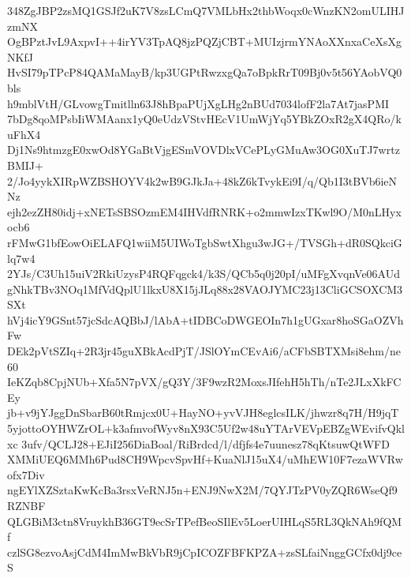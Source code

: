 348ZgJBP2zsMQ1GSJf2uK7V8zsLCmQ7VMLbHx2thbWoqx0cWnzKN2omULIHJzmNX
OgBPztJvL9AxpvI++4irYV3TpAQ8jzPQZjCBT+MUIzjrmYNAoXXnxaCeXsXgNKfJ
HvSI79pTPcP84QAMaMayB/kp3UGPtRwzxgQa7oBpkRrT09Bj0v5t56YAobVQ0bls
h9mblVtH/GLvowgTmitlln63J8hBpaPUjXgLHg2nBUd7034lofF2la7At7jasPMI
7bDg8qoMPsbIiWMAanx1yQ0eUdzVStvHEcV1UmWjYq5YBkZOxR2gX4QRo/kuFhX4
Dj1Ns9htmzgE0xwOd8YGaBtVjgESmVOVDlxVCePLyGMuAw3OG0XuTJ7wrtzBMIJ+
2/Jo4yykXIRpWZBSHOYV4k2wB9GJkJa+48kZ6kTvykEi9I/q/Qb1I3tBVb6ieNNz
ejh2ezZH80idj+xNETsSBSOzmEM4IHVdfRNRK+o2mmwIzxTKwl9O/M0nLHyxocb6
rFMwG1bfEowOiELAFQ1wiiM5UIWoTgbSwtXhgu3wJG+/TVSGh+dR0SQkciGlq7w4
2YJs/C3Uh15uiV2RkiUzysP4RQFqgck4/k3S/QCb5q0j20pI/uMFgXvqnVe06AUd
gNhkTBv3NOq1MfVdQplU1lkxU8X15jJLq88x28VAOJYMC23j13CliGCSOXCM3SXt
hVj4icY9GSnt57jcSdcAQBbJ/lAbA+tIDBCoDWGEOIn7h1gUGxar8hoSGaOZVhFw
DEk2pVtSZIq+2R3jr45guXBkAcdPjT/JSlOYmCEvAi6/aCFbSBTXMsi8ehm/ne60
IeKZqb8CpjNUb+Xfa5N7pVX/gQ3Y/3F9wzR2MoxsJIfehH5hTh/nTe2JLxXkFCEy
jb+v9jYJggDnSbarB60tRmjcx0U+HayNO+yvVJH8eglcsILK/jhwzr8q7H/H9jqT
5yjottoOYHWZrOL+k3afmvofWyv8nX93C5Uf2w48uYTArVEVpEBZgWEvifvQklxc
3ufv/QCLJ28+EJiI256DiaBoal/RiBrdcd/l/dfjfs4e7uunesz78qKtsuwQtWFD
XMMiUEQ6MMh6Pud8CH9WpcvSpvHf+KuaNlJ15uX4/uMhEW10F7ezaWVRwofx7Div
ngEYlXZSztaKwKcBa3rsxVeRNJ5n+ENJ9NwX2M/7QYJTzPV0yZQR6WseQf9RZNBF
QLGBiM3ctn8VruykhB36GT9ecSrTPefBeoSIlEv5LoerUIHLqS5RL3QkNAh9fQMf
czlSG8ezvoAsjCdM4ImMwBkVbR9jCpICOZFBFKPZA+zsSLfaiNnggGCfx0dj9ceS
